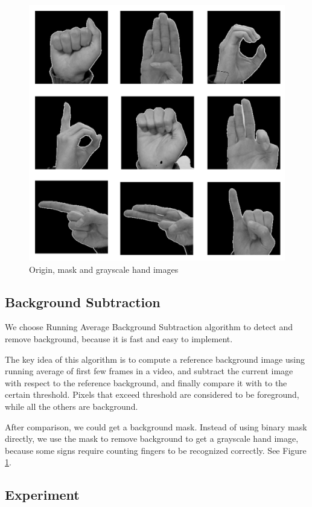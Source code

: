 \documentclass[10pt,twocolumn,letterpaper]{article}
\begin{document}
\begin{figure}[h]
\begin{center}
\includegraphics[width=0.8\linewidth]{imgs/dataset.png}
\end{center}
   \caption{Origin, mask and grayscale hand images}
\label{fig:dataset}
\end{figure}


\subsection{Background Subtraction}

We choose Running Average Background Subtraction algorithm to detect and remove background, because it is fast and easy to implement.

The key idea of this algorithm is to compute a reference background image using running average of first few frames in a video, and subtract the current image with respect to the reference background, and finally compare it with  to the certain threshold. Pixels that exceed threshold are considered to be foreground, while all the others are background.
 
 After comparison, we could get a background mask. Instead of using binary mask directly, we use the mask to remove background to get a grayscale hand image, because some signs require counting fingers to be recognized correctly. See Figure \ref{fig:dataset}.


\subsection{Experiment}
\end{document}
